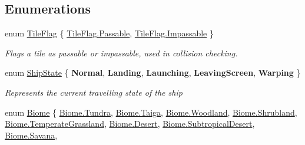 \subsection*{Enumerations}
\begin{DoxyCompactItemize}
\item 
enum \hyperlink{namespace_midnight_blue_ad3f455dc6bab1e76768d1a468ae3e33b}{Tile\+Flag} \{ \hyperlink{namespace_midnight_blue_ad3f455dc6bab1e76768d1a468ae3e33ba01bb7f8bb1804fb74130d34c8c977a99}{Tile\+Flag.\+Passable}, 
\hyperlink{namespace_midnight_blue_ad3f455dc6bab1e76768d1a468ae3e33ba02518d4f54df131d84d3b77bcb2bdce4}{Tile\+Flag.\+Impassable}
 \}\begin{DoxyCompactList}\small\item\em Flags a tile as passable or impassable, used in collision checking. \end{DoxyCompactList}
\item 
enum \hyperlink{namespace_midnight_blue_a46fd3250d826e0dec67892328d5b368c}{Ship\+State} \{ \newline
{\bfseries Normal}, 
{\bfseries Landing}, 
{\bfseries Launching}, 
{\bfseries Leaving\+Screen}, 
\newline
{\bfseries Warping}
 \}\begin{DoxyCompactList}\small\item\em Represents the current travelling state of the ship \end{DoxyCompactList}
\item 
enum \hyperlink{namespace_midnight_blue_a8a6ba5637b64c3eb991f00d48decf381}{Biome} \{ \newline
\hyperlink{namespace_midnight_blue_a8a6ba5637b64c3eb991f00d48decf381ac63e2bf2eb1c92832e0a76fb3734abe8}{Biome.\+Tundra}, 
\hyperlink{namespace_midnight_blue_a8a6ba5637b64c3eb991f00d48decf381a32864c09ef538453b4d8110734ee355b}{Biome.\+Taiga}, 
\hyperlink{namespace_midnight_blue_a8a6ba5637b64c3eb991f00d48decf381a7cb415375c75a66656abe9feb58cd1f3}{Biome.\+Woodland}, 
\hyperlink{namespace_midnight_blue_a8a6ba5637b64c3eb991f00d48decf381a02e89f9921419a94e1ace6a1d24527ec}{Biome.\+Shrubland}, 
\newline
\hyperlink{namespace_midnight_blue_a8a6ba5637b64c3eb991f00d48decf381ae94bf80df7b744d12a6ef9c569b4153d}{Biome.\+Temperate\+Grassland}, 
\hyperlink{namespace_midnight_blue_a8a6ba5637b64c3eb991f00d48decf381a000c016d34ff41e245b69c67f22c83ff}{Biome.\+Desert}, 
\hyperlink{namespace_midnight_blue_a8a6ba5637b64c3eb991f00d48decf381a5b1d05a71f90f79c395a52832581d4f1}{Biome.\+Subtropical\+Desert}, 
\hyperlink{namespace_midnight_blue_a8a6ba5637b64c3eb991f00d48decf381a56a04002e62d11a1ccad061d3692bd7f}{Biome.\+Savana}, 

\end{DoxyCompactItemize}
